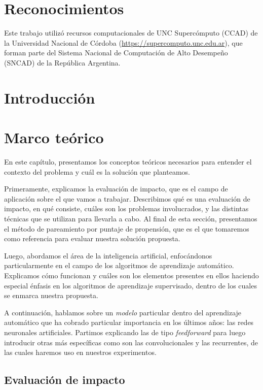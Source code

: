 \documentclass[a4paper,12pt,spanish]{book}
\begin{document}
\chapter*{Reconocimientos}
Este trabajo utilizó recursos computacionales de UNC Supercómputo (CCAD) de la Universidad
Nacional de Córdoba
({\href{https://supercomputo.unc.edu.ar}{https://supercomputo.unc.edu.ar}}), que forman
parte del Sistema Nacional de Computación de Alto Desempeño (SNCAD) de la República
Argentina.


\tableofcontents
\clearpage

\chapter{Introducción}


\chapter{Marco teórico}
En este capítulo, presentamos los conceptos teóricos necesarios para entender el contexto
del problema y cuál es la solución que planteamos.

Primeramente, explicamos la evaluación de impacto, que es el campo de aplicación sobre el
que vamos a trabajar. Describimos qué es una evaluación de impacto, en qué consiste,
cuáles son los problemas involucrados, y las distintas técnicas que se utilizan para
llevarla a cabo. Al final de esta sección, presentamos el método de pareamiento por
puntaje de propensión, que es el que tomaremos como referencia para evaluar nuestra
solución propuesta.

Luego, abordamos el área de la inteligencia artificial, enfocándonos particularmente
en el campo de los algoritmos de aprendizaje automático. Explicamos cómo funcionan y
cuáles son los elementos presentes en ellos haciendo especial énfasis en los algoritmos de
aprendizaje supervisado, dentro de los cuales se enmarca nuestra propuesta.

A continuación, hablamos sobre un \textit{modelo} particular dentro del aprendizaje
automático que ha cobrado particular importancia en los últimos años: las redes neuronales
artificiales. Partimos explicando las de tipo \textit{feedforward} para luego introducir
otras más específicas como son las convolucionales y las recurrentes, de las cuales
haremos uso en nuestros experimentos.

\section{Evaluación de impacto}

\end{document}
